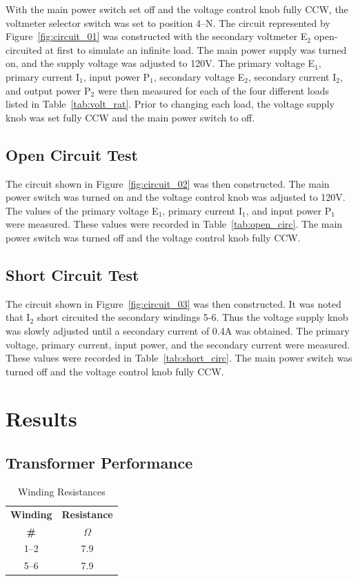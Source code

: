\documentclass{article}
\begin{document}
\label{part1} With the main power switch set off and the voltage control knob
fully CCW, the voltmeter selector switch was set to position 4--N. The circuit
represented by Figure~\ref{fig:circuit_01} was constructed with the secondary
voltmeter E$_2$ open-circuited at first to simulate an infinite load.  The main
power supply was turned on, and the supply voltage was adjusted to {120V}. The
primary voltage E$_1$, primary current I$_1$, input power P$_1$, secondary
voltage E$_2$, secondary current I$_2$, and output power P$_2$ were then
measured for each of the four different loads listed in
Table~\ref{tab:volt_rat}.  Prior to changing each load, the voltage supply
knob was set fully CCW and the main power switch to off.

\subsection{Open Circuit Test}

\label{part2} The circuit shown in Figure~\ref{fig:circuit_02} was then constructed. The main power switch
was turned on and the voltage control knob was adjusted to 120V. The values of the primary voltage E$_1$, primary
current I$_1$, and input power P$_1$ were measured. These values were recorded in Table~\ref{tab:open_circ}.
The main power switch was turned off and the voltage control knob fully CCW.

\subsection{Short Circuit Test}

\label{part3} The circuit shown in Figure~\ref{fig:circuit_03} was then constructed. It was noted that
I$_2$ short circuited the secondary windings 5-6. Thus the voltage supply knob was slowly adjusted until
a secondary current of 0.4A was obtained. The primary voltage, primary current, input power, and the
secondary current were measured. These values were recorded in Table~\ref{tab:short_circ}.
The main power switch was turned off and the voltage control knob fully CCW.

\section{Results}
\subsection{Transformer Performance}
\begin{table}[H]
  \centering
  \begin{tabular}{*{2}{c}}
    \textbf{Winding} & \textbf{Resistance} \\
    \textbf{\#} & $\Omega$ \\
    \hline
    1--2 &  7.9 \\
    5--6 &  7.9 \\
  \end{tabular}
  \caption{Winding Resistances}
  \label{tab:wind_res}
\end{table}
\end{document}
